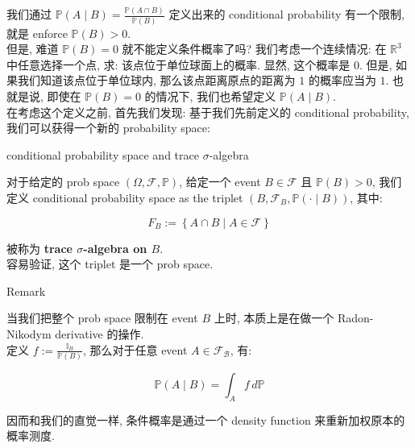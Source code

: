 \documentclass{qlnotes-export}
\begin{document}
我们通过 \({\mathbb{P}}(A \mid B) = \frac{{\mathbb{P}}(A \cap B)}{{\mathbb{P}}(B)}\) 定义出来的 conditional probability 有一个限制, 就是 enforce \({\mathbb{P}}(B) > 0\).\\
但是, 难道 \({\mathbb{P}}(B) = 0\) 就不能定义条件概率了吗? 我们考虑一个连续情况: 在 \({\mathbb{R}}^{3}\) 中任意选择一个点, 求: 该点位于单位球面上的概率. 显然, 这个概率是 0. 但是, 如果我们知道该点位于单位球内, 那么该点距离原点的距离为 \(1\) 的概率应当为 \(1\). 也就是说, 即使在 \({\mathbb{P}}(B) = 0\) 的情况下, 我们也希望定义 \({\mathbb{P}}(A \mid B)\).\\
在考虑这个定义之前, 首先我们发现: 基于我们先前定义的 conditional probability, 我们可以获得一个新的 probability space:

\begin{definition}{conditional probability space and trace \(\sigma\)-algebra}\label{def-01-combinatorics-prob-space-conditional-probability-space-and-trace-sigma-algebra}

对于给定的 prob space \((\Omega,\mathcal{F},{\mathbb{P}})\), 给定一个 event \(B \in \mathcal{F}\) 且 \({\mathbb{P}}(B) > 0\), 我们定义 conditional probability space as the triplet \((B,\mathcal{F}_{B},{\mathbb{P}}( \cdot \mid B))\), 其中:

\[F_{B} := \left\{ {A \cap B \mid A \in \mathcal{F}} \right\}\]

被称为 \textbf{trace \(\sigma\)-algebra on \(B\)}.\\
容易验证, 这个 triplet 是一个 prob space.

\end{definition}

\begin{qlremark}{Remark}

当我们把整个 prob space 限制在 event \(B\) 上时, 本质上是在做一个 Radon-Nikodym derivative 的操作.\\
定义 \(f := \frac{{\mathbb{I}}_{B}}{{\mathbb{P}}(B)}\), 那么对于任意 event \(A \in \mathcal{F}_{\mathcal{B}}\), 有:

\[{\mathbb{P}}(A \mid B) = \int_{A}f\, d{\mathbb{P}}\]

因而和我们的直觉一样, 条件概率是通过一个 density function 来重新加权原本的概率测度.

\end{qlremark}
\end{document}
